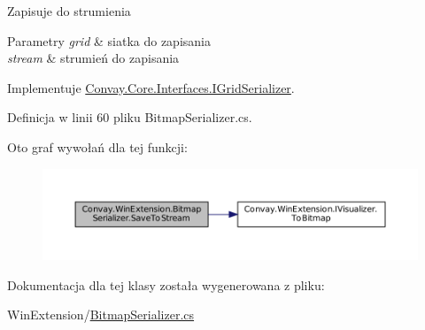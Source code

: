 Zapisuje do strumienia 


\begin{DoxyParams}{Parametry}
{\em grid} & siatka do zapisania\\
\hline
{\em stream} & strumień do zapisania\\
\hline
\end{DoxyParams}


Implementuje \hyperlink{interface_convay_1_1_core_1_1_interfaces_1_1_i_grid_serializer_ac8de4f85acd03d95f73a7c7f85db43b2}{Convay.\+Core.\+Interfaces.\+I\+Grid\+Serializer}.



Definicja w linii 60 pliku Bitmap\+Serializer.\+cs.

Oto graf wywołań dla tej funkcji\+:
\nopagebreak
\begin{figure}[H]
\begin{center}
\leavevmode
\includegraphics[width=350pt]{class_convay_1_1_win_extension_1_1_bitmap_serializer_ac5d034f09f4bdeed5230507e3ad8d683_cgraph}
\end{center}
\end{figure}


Dokumentacja dla tej klasy została wygenerowana z pliku\+:\begin{DoxyCompactItemize}
\item 
Win\+Extension/\hyperlink{_bitmap_serializer_8cs}{Bitmap\+Serializer.\+cs}\end{DoxyCompactItemize}
